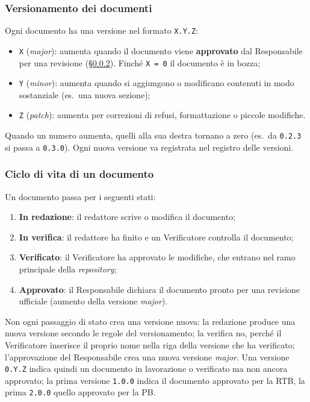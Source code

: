 \documentclass[12pt,a4paper]{article}
\newcommand{\tightlist}{\setlength{\itemsep}{1pt}\setlength{\parskip}{0pt}}
\begin{document}
\subsubsection{Versionamento dei documenti}
Ogni documento ha una versione nel formato \texttt{X.Y.Z}:
\begin{itemize}
\tightlist
\item \texttt{X} (\emph{major}): aumenta quando il documento viene \textbf{approvato} dal Responsabile per una revisione (§\ref{sec:ciclovita}). Finché \texttt{X = 0} il documento è in bozza;
\item \texttt{Y} (\emph{minor}): aumenta quando si aggiungono o modificano contenuti in modo sostanziale (es.\ una nuova sezione);
\item \texttt{Z} (\emph{patch}): aumenta per correzioni di refusi, formattazione o piccole modifiche.
\end{itemize}
Quando un numero aumenta, quelli alla sua destra tornano a zero (es.\ da \texttt{0.2.3} si passa a \texttt{0.3.0}). Ogni nuova versione va registrata nel registro delle versioni.


\subsubsection{Ciclo di vita di un documento}\label{sec:ciclovita}
Un documento passa per i seguenti stati:
\begin{enumerate}
\tightlist
\item \textbf{In redazione}: il redattore scrive o modifica il documento;
\item \textbf{In verifica}: il redattore ha finito e un Verificatore controlla il documento;
\item \textbf{Verificato}: il Verificatore ha approvato le modifiche, che entrano nel ramo principale della \emph{repository};
\item \textbf{Approvato}: il Responsabile dichiara il documento pronto per una revisione ufficiale (aumento della versione \emph{major}).
\end{enumerate}
Non ogni passaggio di stato crea una versione nuova: la redazione produce una nuova versione secondo le regole del versionamento; la verifica no, perché il Verificatore inserisce il proprio nome nella riga della versione che ha verificato; l'approvazione del Responsabile crea una nuova versione \emph{major}. Una versione \texttt{0.Y.Z} indica quindi un documento in lavorazione o verificato ma non ancora approvato; la prima versione \texttt{1.0.0} indica il documento approvato per la RTB, la prima \texttt{2.0.0} quello approvato per la PB.
\end{document}
